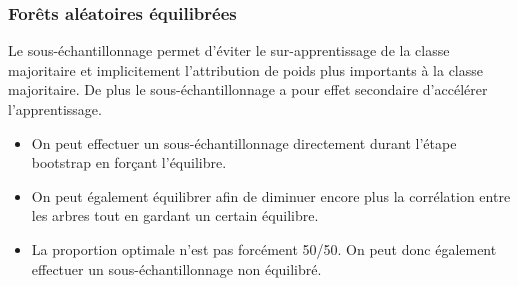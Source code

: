 \documentclass[dvipsnames,10pt]{beamer}
\theoremstyle{plain}
\theoremstyle{definition}
\begin{document}
\begin{frame}
\frametitle{Forêts aléatoires équilibrées}
Le sous-échantillonnage permet d'éviter le sur-apprentissage de la classe majoritaire et implicitement l'attribution de poids plus importants à la classe majoritaire. De plus le sous-échantillonnage a pour effet secondaire d'accélérer l'apprentissage.
\begin{itemize}
    \item On peut effectuer un sous-échantillonnage directement durant l'étape bootstrap en forçant l'équilibre.
    \item On peut également équilibrer  afin de diminuer encore plus la corrélation entre les arbres tout en gardant un certain équilibre.
    \item La proportion optimale n'est pas forcément 50/50. On peut donc également effectuer un sous-échantillonnage non équilibré.
\end{itemize}
\end{frame}
\end{document}
